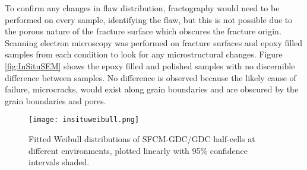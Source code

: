         To confirm any changes in flaw distribution, fractography would need to be performed on every sample, identifying the flaw, but this is not possible due to the porous nature of the fracture surface which obscures the fracture origin.
        Scanning electron microscopy was performed on fracture surfaces and epoxy filled  samples from each condition to look for any microstructural changes.
        Figure \ref{fig:InSituSEM} shows the epoxy filled and polished samples with no discernible difference between samples.
        No difference is observed because the likely cause of failure, microcracks, would exist along grain boundaries and are obscured by the grain boundaries and pores.\cite{Danzer2008,Yu2007}

        \begin{figure}
          \texttt{[image: insituweibull.png]}
          \caption{Fitted Weibull distributions of SFCM-GDC/GDC half-cells at different environments, plotted linearly with 95\% confidence intervals shaded.}
          \label{fig:halfcellweibull}
        \end{figure}

